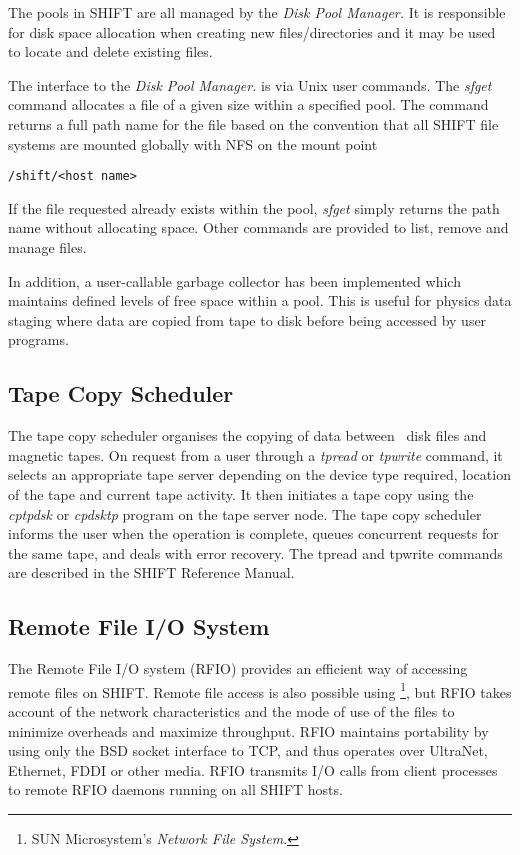 The pools in SHIFT are all managed by the
{\em Disk Pool Manager.}
It is responsible for
disk space allocation when creating new files/directories
and it may be used to locate and delete existing files.
 
The interface to the
{\em Disk Pool Manager.}
is via Unix user commands.
The
{\em sfget}
command allocates a file of a given size within a specified
pool. The command returns a full path name for the file based on the
convention that all SHIFT file systems are mounted globally with NFS
on the mount point
\begin{center}
{\tt /shift/<host name>}
\end{center}
If the file requested already exists within the pool,
{\em sfget}
simply returns the path name without allocating space. Other commands are
provided to list, remove and manage files.
 
In addition,
a user-callable garbage collector has been implemented
which maintains defined levels of free space within a pool.
This is useful for physics data staging where data are copied
from tape to disk before being accessed by user programs.
 
\subsection {Tape Copy Scheduler}
 
The tape copy scheduler organises the copying of data between \shift\ disk files
and magnetic tapes. On request from a user through a {\it tpread} or {\it
 tpwrite}
command, it selects an appropriate tape server depending on
the device type required, location of the tape and current tape activity.
It then initiates
a tape copy using the {\it cptpdsk} or {\it cpdsktp} program on the tape server
 node. The tape copy
scheduler informs the user when the operation is complete, queues
concurrent requests for the same tape, and deals with error recovery.
The tpread and tpwrite commands are described in the SHIFT Reference Manual.
 
\subsection {Remote File I/O System}
 
The Remote File I/O system (RFIO) provides an efficient
way of accessing remote files on SHIFT.
Remote file access is also possible using
\NFS\footnote{SUN Microsystem's {\it Network File System}.},
but RFIO takes account of the network characteristics
and the mode of use of the files to minimize overheads and maximize
throughput.
RFIO maintains portability by using only the BSD socket interface to TCP,
and thus operates over UltraNet, Ethernet, FDDI or other media.
RFIO transmits I/O calls
from client processes to remote RFIO daemons running on all SHIFT hosts.
 
